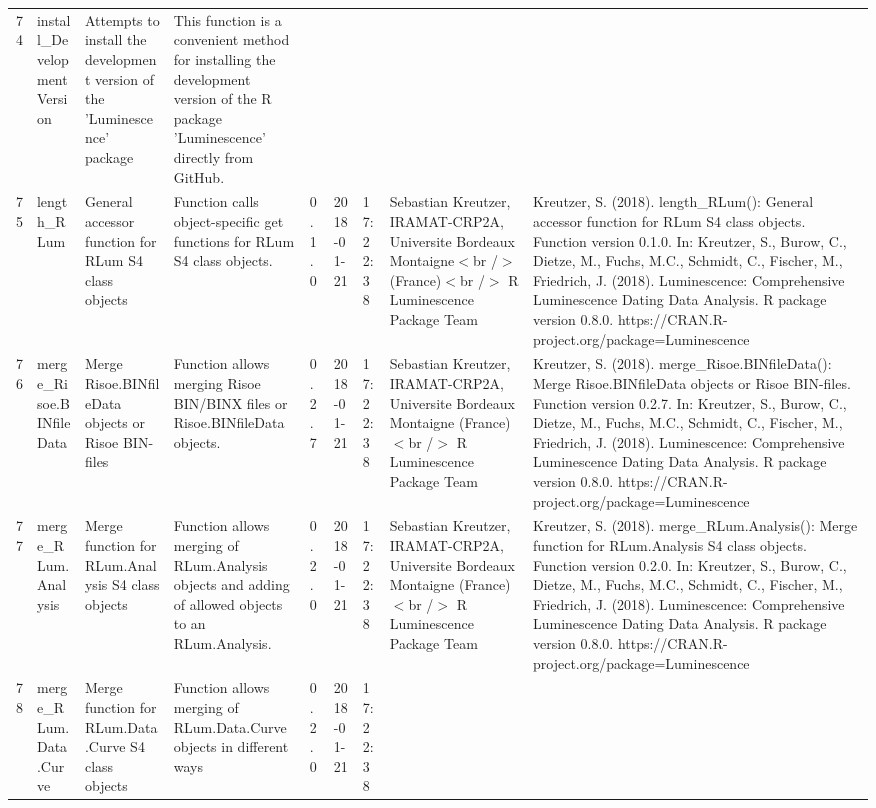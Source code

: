 \begin{table}[ht]
\begin{tabular}{rllllllll}
  74 & install\_DevelopmentVersion & Attempts to install the development version of the 'Luminescence' package & This function is a convenient method for installing the development version of the R package 'Luminescence' directly from GitHub. &  &  &  &  &  \\ 
  75 & length\_RLum & General accessor function for RLum S4 class objects & Function calls object-specific get functions for RLum S4 class objects. & 0.1.0 & 2018-01-21 & 17:22:38
 & Sebastian Kreutzer, IRAMAT-CRP2A, Universite Bordeaux Montaigne$<$br /$>$ (France)$<$br /$>$  R Luminescence Package Team & Kreutzer, S. (2018). length\_RLum(): General accessor function for RLum S4 class objects. Function version 0.1.0. In: Kreutzer, S., Burow, C., Dietze, M., Fuchs, M.C., Schmidt, C., Fischer, M., Friedrich, J. (2018). Luminescence: Comprehensive Luminescence Dating Data Analysis. R package version 0.8.0. https://CRAN.R-project.org/package=Luminescence
 \\ 
  76 & merge\_Risoe.BINfileData & Merge Risoe.BINfileData objects or Risoe BIN-files & Function allows merging Risoe BIN/BINX files or Risoe.BINfileData objects. & 0.2.7 & 2018-01-21 & 17:22:38
 & Sebastian Kreutzer, IRAMAT-CRP2A, Universite Bordeaux Montaigne (France)$<$br /$>$  R Luminescence Package Team & Kreutzer, S. (2018). merge\_Risoe.BINfileData(): Merge Risoe.BINfileData objects or Risoe BIN-files. Function version 0.2.7. In: Kreutzer, S., Burow, C., Dietze, M., Fuchs, M.C., Schmidt, C., Fischer, M., Friedrich, J. (2018). Luminescence: Comprehensive Luminescence Dating Data Analysis. R package version 0.8.0. https://CRAN.R-project.org/package=Luminescence
 \\ 
  77 & merge\_RLum.Analysis & Merge function for RLum.Analysis S4 class objects & Function allows merging of RLum.Analysis objects and adding of allowed objects to an RLum.Analysis. & 0.2.0 & 2018-01-21 & 17:22:38
 & Sebastian Kreutzer, IRAMAT-CRP2A, Universite Bordeaux Montaigne (France)$<$br /$>$  R Luminescence Package Team & Kreutzer, S. (2018). merge\_RLum.Analysis(): Merge function for RLum.Analysis S4 class objects. Function version 0.2.0. In: Kreutzer, S., Burow, C., Dietze, M., Fuchs, M.C., Schmidt, C., Fischer, M., Friedrich, J. (2018). Luminescence: Comprehensive Luminescence Dating Data Analysis. R package version 0.8.0. https://CRAN.R-project.org/package=Luminescence
 \\ 
  78 & merge\_RLum.Data.Curve & Merge function for RLum.Data.Curve S4 class objects & Function allows merging of RLum.Data.Curve objects in different ways & 0.2.0 & 2018-01-21 & 17:22:38

\end{tabular}
\end{table}

